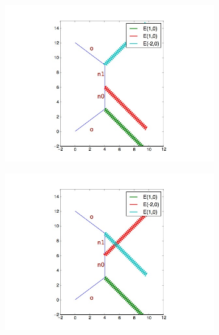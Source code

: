\documentclass[11pt,a4paper,notitlepage]{article}
\begin{document}
\begin{figure}[htb]
\centering
\begin{subfigure}{.33\textwidth}
  \centering
  \includegraphics[width=1\linewidth]{feyn_ex1a.jpg}
  \label{fig:sub1}
\end{subfigure}%
\begin{subfigure}{.33\textwidth}
  \centering
  \includegraphics[width=1\linewidth]{feyn_ex1b.jpg}
  \label{fig:sub2}
\end{subfigure}
\begin{subfigure}{.33\textwidth}
  \centering

\end{subfigure}
\end{figure}
\end{document}
